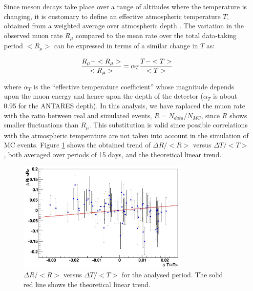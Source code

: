 \documentclass[a4paper]{jpconf}
\begin{document}
Since meson decays take place over a range of altitudes where the temperature is changing, it is customary to define an effective atmospheric temperature $T$, obtained from a weighted average over atmospheric depth \cite{grashorn}. The variation in the observed muon rate $R_{\mu}$ compared to the mean rate over the total data-taking period $<{R}_{\mu}>$  can be  expressed in terms of a similar change in $T$ as:

{
\small
\begin{equation}
\centering
\label{eq:temp}
\frac{R_{\mu}-<R_{\mu}>}{<R_{\mu}>} = \alpha _T \frac{T-<T>}{<T>}
\end{equation}
}

where $\alpha_T$ is the ``effective temperature coefficient'' whose magnitude depends upon the muon energy and hence upon the depth of the detector ($\alpha _T$ is about 0.95 for the ANTARES depth). In this analysis, we have raplaced the muon rate with the ratio between real and simulated events, $R = N_{data} /N_{MC}$, since $R$ shows smaller fluctuations than $R_{\mu}$. This substitution is valid since possible correlations with the atmospheric temperature are not taken into account in the simulation of MC events. 
Figure \ref {label} shows the obtained trend of $\Delta R/ <R>$ versus $\Delta T/ <T>$, both averaged over periods of 15 days, and the theoretical linear trend. 

\begin{figure}[h]
\includegraphics[width=20pc]{Fig_5}\hspace{2pc}%
\begin{minipage}[b]{14pc}\caption{\label{label}$\Delta R/ <R>$ versus $\Delta T/ <T>$ for the analysed period. The solid red line shows the theoretical linear trend.}
\end{minipage}
\end{figure}
\end{document}
